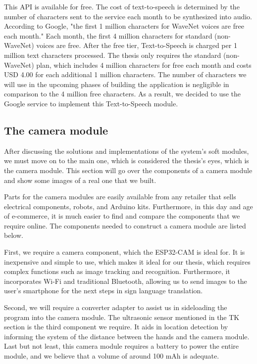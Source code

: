 This API is available for free. The cost of text-to-speech is determined by the number of characters sent to the service each month to be synthesized into audio. According to Google, "the first 1 million characters for WaveNet voices are free each month." Each month, the first 4 million characters for standard (non-WaveNet) voices are free. After the free tier, Text-to-Speech is charged per 1 million text characters processed. The thesis only requires the standard (non-WaveNet) plan, which includes 4 million characters for free each month and costs USD 4.00 for each additional 1 million characters. The number of characters we will use in the upcoming phases of building the application is negligible in comparison to the 4 million free characters. As a result, we decided to use the Google service to implement this Text-to-Speech module.

\subsection{The camera module}

After discussing the solutions and implementations of the system's soft modules, we must move on to the main one, which is considered the thesis's eyes, which is the camera module. This section will go over the components of a camera module and show some images of a real one that we built.

Parts for the camera modules are easily available from any retailer that sells electrical components, robots, and Arduino kits. Furthermore, in this day and age of e-commerce, it is much easier to find and compare the components that we require online. The components needed to construct a camera module are listed below.

First, we require a camera component, which the ESP32-CAM is ideal for. It is inexpensive and simple to use, which makes it ideal for our thesis, which requires complex functions such as image tracking and recognition. Furthermore, it incorporates Wi-Fi and traditional Bluetooth, allowing us to send images to the user's smartphone for the next steps in sign language translation.

Second, we will require a converter adapter to assist us in sideloading the program into the camera module. The ultrasonic sensor mentioned in the TK section is the third component we require. It aids in location detection by informing the system of the distance between the hands and the camera module. Last but not least, this camera module requires a battery to power the entire module, and we believe that a volume of around 100 mAh is adequate.

